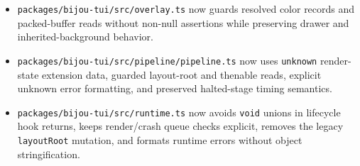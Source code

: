 \begin{itemize}
\item
  \texttt{p\allowbreak{}a\allowbreak{}c\allowbreak{}k\allowbreak{}a\allowbreak{}g\allowbreak{}e\allowbreak{}s\allowbreak{}/\allowbreak{}b\allowbreak{}i\allowbreak{}j\allowbreak{}o\allowbreak{}u\allowbreak{}-\allowbreak{}t\allowbreak{}u\allowbreak{}i\allowbreak{}/\allowbreak{}s\allowbreak{}r\allowbreak{}c\allowbreak{}/\allowbreak{}o\allowbreak{}v\allowbreak{}e\allowbreak{}r\allowbreak{}l\allowbreak{}a\allowbreak{}y\allowbreak{}.\allowbreak{}t\allowbreak{}s} now guards resolved color records and packed-buffer reads without non-null assertions while preserving drawer and inherited-background behavior.
\item
  \texttt{p\allowbreak{}a\allowbreak{}c\allowbreak{}k\allowbreak{}a\allowbreak{}g\allowbreak{}e\allowbreak{}s\allowbreak{}/\allowbreak{}b\allowbreak{}i\allowbreak{}j\allowbreak{}o\allowbreak{}u\allowbreak{}-\allowbreak{}t\allowbreak{}u\allowbreak{}i\allowbreak{}/\allowbreak{}s\allowbreak{}r\allowbreak{}c\allowbreak{}/\allowbreak{}p\allowbreak{}i\allowbreak{}p\allowbreak{}e\allowbreak{}l\allowbreak{}i\allowbreak{}n\allowbreak{}e\allowbreak{}/\allowbreak{}p\allowbreak{}i\allowbreak{}p\allowbreak{}e\allowbreak{}l\allowbreak{}i\allowbreak{}n\allowbreak{}e\allowbreak{}.\allowbreak{}t\allowbreak{}s} now uses \texttt{u\allowbreak{}n\allowbreak{}k\allowbreak{}n\allowbreak{}o\allowbreak{}w\allowbreak{}n} render-state extension data, guarded layout-root and thenable reads, explicit unknown error formatting, and preserved halted-stage timing semantics.
\item
  \texttt{p\allowbreak{}a\allowbreak{}c\allowbreak{}k\allowbreak{}a\allowbreak{}g\allowbreak{}e\allowbreak{}s\allowbreak{}/\allowbreak{}b\allowbreak{}i\allowbreak{}j\allowbreak{}o\allowbreak{}u\allowbreak{}-\allowbreak{}t\allowbreak{}u\allowbreak{}i\allowbreak{}/\allowbreak{}s\allowbreak{}r\allowbreak{}c\allowbreak{}/\allowbreak{}r\allowbreak{}u\allowbreak{}n\allowbreak{}t\allowbreak{}i\allowbreak{}m\allowbreak{}e\allowbreak{}.\allowbreak{}t\allowbreak{}s} now avoids \texttt{v\allowbreak{}o\allowbreak{}i\allowbreak{}d} unions in lifecycle hook returns, keeps render/crash queue checks explicit, removes the legacy \texttt{l\allowbreak{}a\allowbreak{}y\allowbreak{}o\allowbreak{}u\allowbreak{}t\allowbreak{}R\allowbreak{}o\allowbreak{}o\allowbreak{}t} mutation, and formats runtime errors without object stringification.
\end{itemize}

